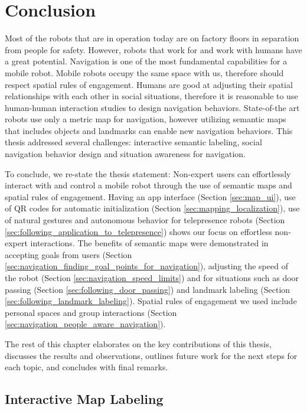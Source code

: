 \chapter{Conclusion}
\label{chapter:conclusion}

Most of the robots that are in operation today are on factory floors in separation from people for safety. However, robots that work for and work with humans have a great potential. Navigation is one of the most fundamental capabilities for a mobile robot. Mobile robots occupy the same space with us, therefore should respect spatial rules of engagement. Humans are good at adjusting their spatial relationships with each other in social situations, therefore it is reasonable to use human-human interaction studies to design navigation behaviors. State-of-the art robots use only a metric map for navigation, however utilizing semantic maps that includes objects and landmarks can enable new navigation behaviors. This thesis addressed several challenges: interactive semantic labeling, social navigation behavior design and situation awareness for navigation. 

To conclude, we re-state the thesis statement: Non-expert users can effortlessly interact with and control a mobile robot through the use of semantic maps and spatial rules of engagement. Having an app interface (Section \ref{sec:map_ui}), use of QR codes for automatic initialization (Section \ref{sec:mapping_localization}), use of natural gestures and autonomous behavior for telepresence robots (Section \ref{sec:following_application_to_telepresence}) shows our focus on effortless non-expert interactions. The benefits of semantic maps were demonstrated in accepting goals from users (Section \ref{sec:navigation_finding_goal_points_for_navigation}), adjusting the speed of the robot (Section \ref{sec:navigation_speed_limits}) and for situations such as door passing (Section \ref{sec:following_door_passing}) and landmark labeling (Section \ref{sec:following_landmark_labeling}). Spatial rules of engagement we used include personal spaces and group interactions (Section \ref{sec:navigation_people_aware_navigation}).

The rest of this chapter elaborates on the key contributions of this thesis, discusses the results and observations, outlines future work for the next steps for each topic, and concludes with final remarks.

\section{Interactive Map Labeling}

